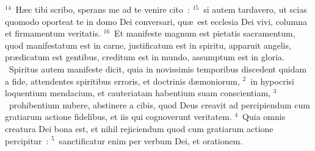 ${}^{14}$~H\ae c tibi scribo, sperans me ad te venire cito~:
${}^{15}$~si autem tardavero, ut scias quomodo oporteat te in domo Dei conversari, qu\ae\ est ecclesia Dei vivi, columna et firmamentum veritatis.
${}^{16}$~Et manifeste magnum est pietatis sacramentum, quod manifestatum est in carne, justificatum est in spiritu, apparuit angelis, pr\ae dicatum est gentibus, creditum est in mundo, assumptum est in gloria.
~Spiritus autem manifeste dicit, quia in novissimis temporibus discedent quidam a fide, attendentes spiritibus erroris, et doctrinis d\ae moniorum,
${}^{2}$~in hypocrisi loquentium mendacium, et cauteriatam habentium suam conscientiam,
${}^{3}$~prohibentium nubere, abstinere a cibis, quod Deus creavit ad percipiendum cum gratiarum actione fidelibus, et iis qui cognoverunt veritatem.
${}^{4}$~Quia omnis creatura Dei bona est, et nihil rejiciendum quod cum gratiarum actione percipitur~:
${}^{5}$~sanctificatur enim per verbum Dei, et orationem.


